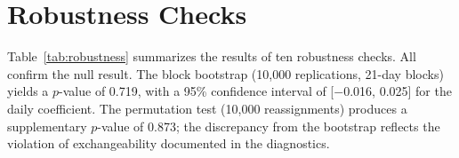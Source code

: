 \documentclass[12pt,a4paper]{article}
\begin{document}

\section{Robustness Checks}\label{sec:robustness}

Table~\ref{tab:robustness} summarizes the results of ten robustness checks. All confirm the null result. The block bootstrap (10,000 replications, 21-day blocks) yields a $p$-value of 0.719, with a 95\% confidence interval of [$-$0.016, 0.025] for the daily coefficient. The permutation test (10,000 reassignments) produces a supplementary $p$-value of 0.873; the discrepancy from the bootstrap reflects the violation of exchangeability documented in the diagnostics.
\end{document}

